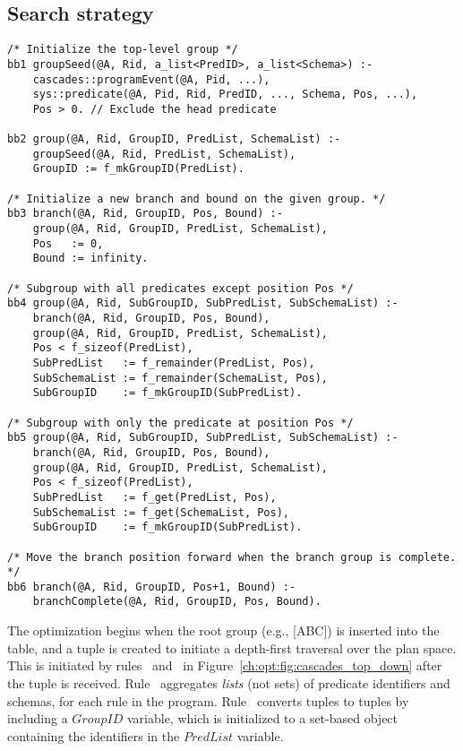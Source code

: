 \subsection{Search strategy}
\label{ch:opt:sec:cascades_search}

\begin{figure*}
\ssp
\centering
\begin{lstlisting}
/* Initialize the top-level group */
bb1 groupSeed(@A, Rid, a_list<PredID>, a_list<Schema>) :-
    cascades::programEvent(@A, Pid, ...),
    sys::predicate(@A, Pid, Rid, PredID, ..., Schema, Pos, ...),
    Pos > 0. // Exclude the head predicate

bb2 group(@A, Rid, GroupID, PredList, SchemaList) :-
    groupSeed(@A, Rid, PredList, SchemaList),
    GroupID := f_mkGroupID(PredList).

/* Initialize a new branch and bound on the given group. */
bb3 branch(@A, Rid, GroupID, Pos, Bound) :-
    group(@A, Rid, GroupID, PredList, SchemaList),
    Pos   := 0,
    Bound := infinity.

/* Subgroup with all predicates except position Pos */
bb4 group(@A, Rid, SubGroupID, SubPredList, SubSchemaList) :-
    branch(@A, Rid, GroupID, Pos, Bound),
    group(@A, Rid, GroupID, PredList, SchemaList),
    Pos < f_sizeof(PredList),
    SubPredList   := f_remainder(PredList, Pos),
    SubSchemaList := f_remainder(SchemaList, Pos),
    SubGroupID    := f_mkGroupID(SubPredList).

/* Subgroup with only the predicate at position Pos */
bb5 group(@A, Rid, SubGroupID, SubPredList, SubSchemaList) :-
    branch(@A, Rid, GroupID, Pos, Bound),
    group(@A, Rid, GroupID, PredList, SchemaList),
    Pos < f_sizeof(PredList),
    SubPredList   := f_get(PredList, Pos),
    SubSchemaList := f_get(SchemaList, Pos),
    SubGroupID    := f_mkGroupID(SubPredList).

/* Move the branch position forward when the branch group is complete. */
bb6 branch(@A, Rid, GroupID, Pos+1, Bound) :-
    branchComplete(@A, Rid, GroupID, Pos, Bound).
\end{lstlisting}
\caption{\label{ch:opt:fig:cascades_top_down} Cascades top-down search strategy rules.}
\end{figure*}

The optimization begins when the root group (e.g., [ABC]) is inserted into the
 table, and a  tuple is created to initiate a depth-first
traversal over the plan space.  This is initiated by rules~
and~ in Figure~\ref{ch:opt:fig:cascades_top_down} after the
 tuple is received.  Rule~ aggregates {\em
lists} (not sets) of predicate identifiers and schemas, for each rule in the
program.  Rule~ converts  tuples to  tuples by
including a $GroupID$ variable, which is initialized to a set-based object
containing the identifiers in the $PredList$ variable. 

